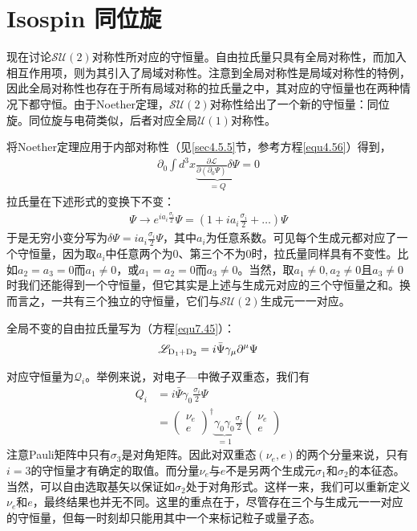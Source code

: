 \section[同位旋]{Isospin \quad 同位旋}\label{sec7.7}
现在讨论$\mathcal{SU}(2)$对称性所对应的守恒量。自由拉氏量只具有全局对称性，而加入相互作用项，则为其引入了局域对称性。注意到全局对称性是局域对称性的特例，因此全局对称性也存在于所有局域对称的拉氏量之中，其对应的守恒量也在两种情况下都守恒。由于Noether定理，$\mathcal{SU}(2)$对称性给出了一个新的守恒量：同位旋。同位旋与电荷类似，后者对应全局$\mathcal{U}(1)$对称性。

将Noether定理应用于内部对称性（见\ref{sec4.5.5}节，参考方程\eqref{equ4.56}）得到，
\begin{align}
\partial_0\int{d^3x\underbrace{\frac{\partial\mathscr{L}}{\partial(\partial_0\Psi)}\delta\Psi}_{=Q}}=0
\label{equ7.131}
\end{align}
拉氏量在下述形式的变换下不变：
\begin{align}
\Psi\rightarrow e^{ia_i\frac{\sigma_i}{2}}\Psi=(1+ia_i\frac{\sigma_i}{2}+\ldots)\Psi
\label{equ7.132}
\end{align}
于是无穷小变分写为$\delta\Psi=ia_i\frac{\sigma_i}{2}  \Psi$，其中$a_i$为任意系数。可见每个生成元都对应了一个守恒量，因为取$a_i$中任意两个为0、第三个不为0时，拉氏量同样具有不变性。比如$a_2=a_3=0$而$a_1\ne0$，或$a_1=a_2=0$而$a_3\ne0$。当然，取$a_1\ne0,a_2\ne0$且$a_3\ne0$时我们还能得到一个守恒量，但它其实是上述与生成元对应的三个守恒量之和。换而言之，一共有三个独立的守恒量，它们与$\mathcal{SU}(2)$生成元一一对应。

全局不变的自由拉氏量写为（方程\eqref{equ7.45}）：
\begin{align*}
\mathscr{L}_\text{D\textsubscript{1}+D\textsubscript{2}}=i\bar{\Psi}\gamma_\mu\partial^\mu\Psi
\end{align*}

对应守恒量为$\mathcal{Q}_i$。举例来说，对电子—中微子双重态，我们有
\begin{align}
Q_i&=i\bar{\Psi}\gamma_0\frac{\sigma_i}{2}\Psi\nonumber\\
&=\begin{pmatrix}\nu_e \\ e\end{pmatrix}^\dag\underbrace{\gamma_0\gamma_0}_{=1}\frac{\sigma_i}{2}\begin{pmatrix}\nu_e \\ e\end{pmatrix}
\label{equ7.133}
\end{align}
注意Pauli矩阵中只有$\sigma_3$是对角矩阵。因此对双重态$(\nu_e, e)$的两个分量来说，只有$i=3$的守恒量才有确定的取值。而分量$\nu_e$与$e$不是另两个生成元$\sigma_1$和$\sigma_2$的本征态。当然，可以自由选取基矢以保证如$\sigma_2$处于对角形式。这样一来，我们可以重新定义$\nu_e$和$e$，最终结果也并无不同。这里的重点在于，尽管存在三个与生成元一一对应的守恒量，但每一时刻却只能用其中一个来标记粒子或量子态。

